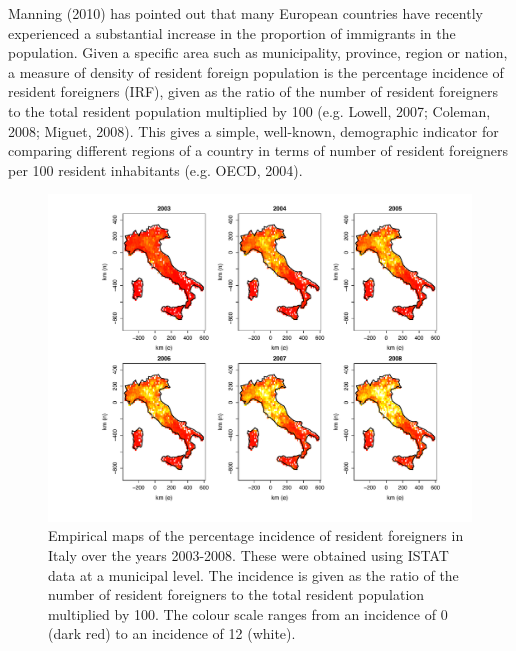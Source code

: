 Manning (2010) has pointed out that many European countries have recently experienced a substantial increase in the proportion of immigrants in the population. Given a specific area such as municipality, province, region or nation, a measure of density of resident foreign population is the percentage incidence of resident foreigners (IRF), given as the ratio of the number of resident foreigners to the total resident population multiplied by 100 (e.g. Lowell, 2007; Coleman, 2008; Miguet, 2008). This gives a simple, well-known, demographic indicator for comparing different regions of a country in terms of number of resident foreigners per 100 resident inhabitants (e.g. OECD, 2004). 

\begin{figure}[tbp]
	\centering
		\includegraphics[width=\textwidth]{it/Raw}
	\caption{Empirical maps of the percentage incidence of resident foreigners in Italy over the years 2003-2008. These were obtained using ISTAT data at a municipal level.	The incidence is given as the ratio of the number of resident foreigners to the total resident population multiplied by 100. The colour scale ranges from an incidence of 0 (dark red) to an incidence of 12 (white).}
	\label{Rd}
\end{figure}

